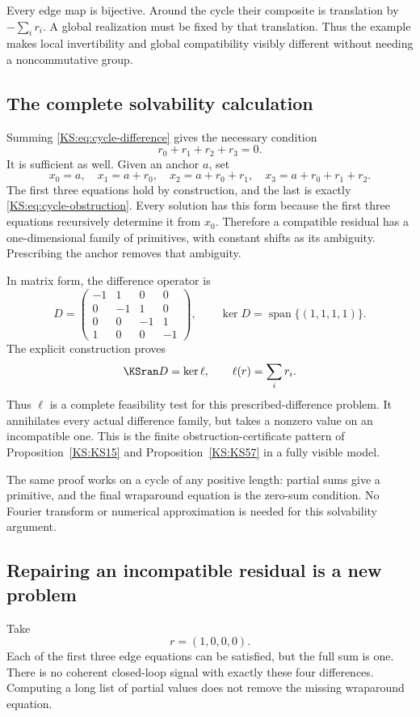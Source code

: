 Every edge map is bijective. Around the cycle their composite is translation by \(-\sum_i r_i\). A global realization must be fixed by that translation. Thus the example makes local invertibility and global compatibility visibly different without needing a noncommutative group.

\subsection{The complete solvability calculation}
Summing \eqref{KS:eq:cycle-difference} gives the necessary condition
\begin{equation}\label{KS:eq:cycle-obstruction}
 r_0+r_1+r_2+r_3=0.
\end{equation}
It is sufficient as well. Given an anchor \(a\), set
\[
 x_0=a,\quad x_1=a+r_0,\quad
 x_2=a+r_0+r_1,\quad x_3=a+r_0+r_1+r_2.
\]
The first three equations hold by construction, and the last is exactly \eqref{KS:eq:cycle-obstruction}. Every solution has this form because the first three equations recursively determine it from \(x_0\). Therefore a compatible residual has a one-dimensional family of primitives, with constant shifts as its ambiguity. Prescribing the anchor removes that ambiguity.

In matrix form, the difference operator is
\[
 D=\begin{pmatrix}
 -1&1&0&0\\
 0&-1&1&0\\
 0&0&-1&1\\
 1&0&0&-1
 \end{pmatrix},\qquad
 \ker D=\operatorname{span}\{(1,1,1,1)\}.
\]
The explicit construction proves
\[
 \KSran D=\ker\ell,\qquad \ell(r)=\sum_i r_i.
\]
Thus \(\ell\) is a complete feasibility test for this prescribed-difference problem. It annihilates every actual difference family, but takes a nonzero value on an incompatible one. This is the finite obstruction-certificate pattern of Proposition~\ref{KS:KS15} and Proposition~\ref{KS:KS57} in a fully visible model.

The same proof works on a cycle of any positive length: partial sums give a primitive, and the final wraparound equation is the zero-sum condition. No Fourier transform or numerical approximation is needed for this solvability argument.

\subsection{Repairing an incompatible residual is a new problem}
Take
\[
 r=(1,0,0,0).
\]
Each of the first three edge equations can be satisfied, but the full sum is one. There is no coherent closed-loop signal with exactly these four differences. Computing a long list of partial values does not remove the missing wraparound equation.

